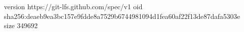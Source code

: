 version https://git-lfs.github.com/spec/v1
oid sha256:deaeb9ea3bc157e9fdde8a7529b6744981094d1fea60af22f13de87dafa5303e
size 349692
